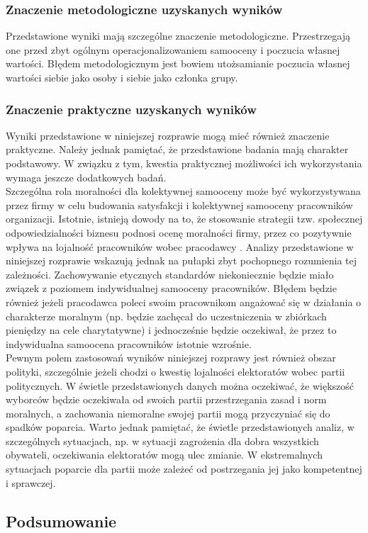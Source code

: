 \documentclass[man]{apa6}
\begin{document}
\subsubsection{Znaczenie metodologiczne uzyskanych wyników}

Przedstawione wyniki mają szczególne znaczenie metodologiczne. Przestrzegają one przed zbyt ogólnym operacjonalizowaniem samooceny i poczucia własnej wartości. Błędem metodologicznym jest bowiem utożsamianie poczucia własnej wartości siebie jako osoby i siebie jako członka grupy.

\subsubsection{Znaczenie praktyczne uzyskanych wyników}

Wyniki przedstawione w niniejszej rozprawie mogą mieć również znaczenie praktyczne. Należy jednak pamiętać, że przedstawione badania mają charakter podstawowy. W związku z tym, kwestia praktycznej możliwości ich wykorzystania wymaga jeszcze dodatkowych badań.\\

Szczególna rola moralności dla kolektywnej samooceny może być wykorzystywana przez firmy w celu budowania satysfakcji i kolektywnej samooceny pracowników organizacji. Istotnie, istnieją dowody na to, że stosowanie strategii tzw. społecznej odpowiedzialności biznesu podnosi ocenę moralności firmy, przez co pozytywnie wpływa na lojalność pracowników wobec pracodawcy \parencite{bauman2012corporate, ellemers2011corporate}. Analizy przedstawione w niniejszej rozprawie wskazują jednak na pułapki zbyt pochopnego rozumienia tej zależności. Zachowywanie etycznych standardów niekoniecznie będzie miało związek z poziomem indywidualnej samooceny pracowników. Błędem będzie również jeżeli pracodawca poleci swoim pracownikom angażować się w działania o charakterze moralnym (np. będzie zachęcał do uczestniczenia w zbiórkach pieniędzy na cele charytatywne) i jednocześnie będzie oczekiwał, że przez to indywidualna samoocena pracowników istotnie wzrośnie.\\

Pewnym polem zastosowań wyników niniejszej rozprawy jest również obszar polityki, szczególnie jeżeli chodzi o kwestię  lojalności elektoratów wobec partii politycznych. W świetle przedstawionych danych można oczekiwać, że większość wyborców będzie oczekiwała od swoich partii przestrzegania zasad i norm moralnych, a zachowania niemoralne swojej partii mogą przyczyniać się do spadków poparcia. Warto jednak pamiętać, że świetle przedstawionych analiz, w szczególnych sytuacjach, np. w sytuacji zagrożenia dla dobra wszystkich obywateli, oczekiwania elektoratów mogą ulec zmianie. W ekstremalnych sytuacjach poparcie dla partii może zależeć od postrzegania jej jako kompetentnej i sprawczej.\\

\subsection{Podsumowanie}




\printbibliography
\end{document}
